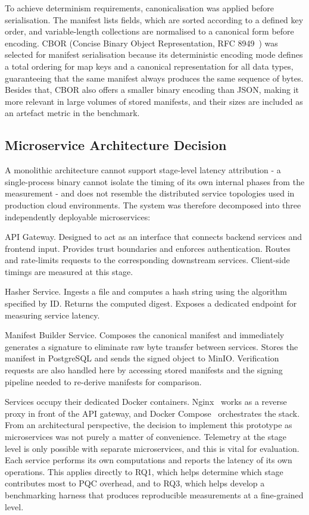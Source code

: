 \documentclass[12pt,a4paper]{article}
\begin{document}
To achieve determinism requirements, canonicalisation was applied before serialisation. The manifest lists fields, which are sorted according to a defined key order, and variable-length collections are normalised to a canonical form before encoding. CBOR (Concise Binary Object Representation, RFC 8949~\cite{rfc8949-cbor}) was selected for manifest serialisation because its deterministic encoding mode defines a total ordering for map keys and a canonical representation for all data types, guaranteeing that the same manifest always produces the same sequence of bytes. Besides that, CBOR also offers a smaller binary encoding than JSON, making it more relevant in large volumes of stored manifests, and their sizes are included as an artefact metric in the benchmark.

\subsection{Microservice Architecture Decision}

A monolithic architecture cannot support stage-level latency attribution - a single-process binary cannot isolate the timing of its own internal phases from the measurement - and does not resemble the distributed service topologies used in production cloud environments. The system was therefore decomposed into three independently deployable microservices:

API Gateway. Designed to act as an interface that connects backend services and frontend input. Provides trust boundaries and enforces authentication. Routes and rate-limits requests to the corresponding downstream services. Client-side timings are measured at this stage.

Hasher Service. Ingests a file and computes a hash string using the algorithm specified by ID. Returns the computed digest. Exposes a dedicated endpoint for measuring service latency.

Manifest Builder Service. Composes the canonical manifest and immediately generates a signature to eliminate raw byte transfer between services. Stores the manifest in PostgreSQL and sends the signed object to MinIO. Verification requests are also handled here by accessing stored manifests and the signing pipeline needed to re-derive manifests for comparison.

Services occupy their dedicated Docker containers. Nginx~\cite{nginx-docs} works as a reverse proxy in front of the API gateway, and Docker Compose~\cite{docker-compose-docs} orchestrates the stack. From an architectural perspective, the decision to implement this prototype as microservices was not purely a matter of convenience. Telemetry at the stage level is only possible with separate microservices, and this is vital for evaluation. Each service performs its own computations and reports the latency of its own operations. This applies directly to RQ1, which helps determine which stage contributes most to PQC overhead, and to RQ3, which helps develop a benchmarking harness that produces reproducible measurements at a fine-grained level.
\end{document}
